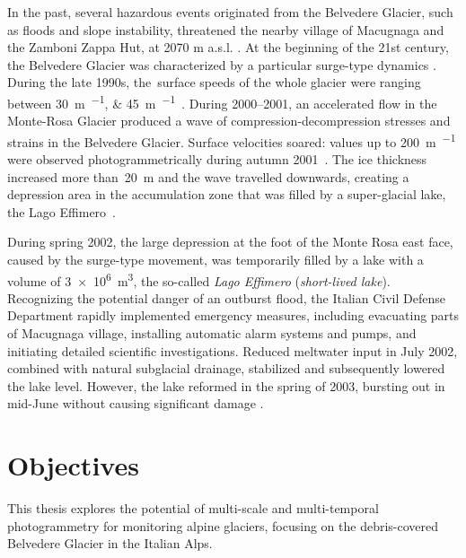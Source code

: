 In the past, several hazardous events originated from the Belvedere Glacier, such as floods
and slope instability, threatened the nearby village of Macugnaga and the Zamboni Zappa
Hut, at 2070 m a.s.l. \citep{Kaab2004}.
At the beginning of the 21st century, the Belvedere Glacier was characterized by a
particular surge-type dynamics  \citep{Haeberli2002}.
During the late 1990s, the~surface speeds of the whole glacier were ranging between
\SIlist{30;45}{\meter\per\year}~\citep{Roethlisberger1985, Kaab2005}.
During 2000--2001, an accelerated flow in the Monte-Rosa Glacier produced a wave of
compression-decompression stresses and strains in the Belvedere Glacier.
Surface velocities soared: values up to \SI{200}{\meter\per\year} were observed
photogrammetrically during autumn 2001~\citep{Kaab2004}.
The ice thickness increased more than~\SI{20}{\meter} and the wave travelled downwards,
creating a depression area in the accumulation zone that was filled by a super-glacial
lake, the Lago Effimero~\citep{Haeberli2002, Mortara2009}.

During spring 2002, the large depression at the foot of the Monte Rosa east face, caused by the surge-type movement, was temporarily filled by a lake with a volume of \SI{3e6}{\cubic\meter}, the so-called \textit{Lago Effimero} (\textit{short-lived lake}).
Recognizing the potential danger of an outburst flood, the Italian Civil Defense Department rapidly 
implemented emergency measures, including evacuating parts of Macugnaga village, installing automatic 
alarm systems and pumps, and initiating detailed scientific investigations. 
Reduced meltwater input in July 2002, combined with natural subglacial drainage, stabilized and subsequently 
lowered the lake level.
However, the lake reformed in the spring of 2003, bursting out in mid-June without causing significant damage \citep{Kaab2004}.




\section{Objectives}

This thesis explores the potential of multi-scale and multi-temporal photogrammetry 
for monitoring alpine glaciers, focusing on the debris-covered Belvedere Glacier in the Italian Alps.

